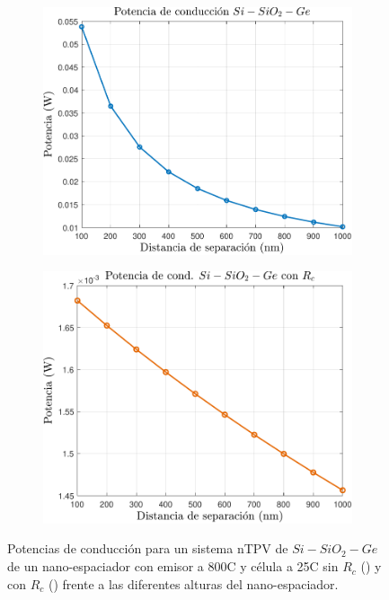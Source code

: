 \begin{figure}[H]
	\centering
	\begin{subfigure}[b]{0.49\textwidth}
		\centering
		\includegraphics[width=1\textwidth]{Pn_SiSiO2Ge.pdf}
		\caption{ }
		\label{fig:Pn_SiSiO2Ge}
	\end{subfigure}
	\hfill
	\begin{subfigure}[b]{0.49\textwidth}
		\centering
		\includegraphics[width=1.00\textwidth]{Prc2_SiSiO2Ge.pdf}
		\caption{ }
		\label{fig:Prc_SiSiO2Ge}
	\end{subfigure}
	\caption{Potencias de conducción para un sistema nTPV de $Si-SiO_2-Ge$ de un nano-espaciador con emisor a 800\textdegree C y célula a 25\textdegree C sin $R_c$ () y con $R_c$ () frente a las diferentes alturas del nano-espaciador.}
	\label{fig:Pcond_SiSiO2Ge}
\end{figure}
